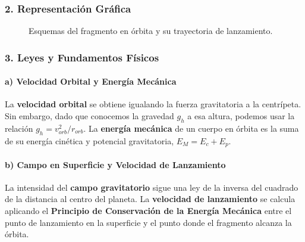 \subsubsection*{2. Representación Gráfica}
\begin{figure}[H]
    \centering
    \hfill
    \caption{Esquemas del fragmento en órbita y su trayectoria de lanzamiento.}
\end{figure}

\subsubsection*{3. Leyes y Fundamentos Físicos}
\paragraph*{a) Velocidad Orbital y Energía Mecánica}
La \textbf{velocidad orbital} se obtiene igualando la fuerza gravitatoria a la centrípeta. Sin embargo, dado que conocemos la gravedad $g_h$ a esa altura, podemos usar la relación $g_h = v_{orb}^2/r_{orb}$. La \textbf{energía mecánica} de un cuerpo en órbita es la suma de su energía cinética y potencial gravitatoria, $E_M = E_c + E_p$.
\paragraph*{b) Campo en Superficie y Velocidad de Lanzamiento}
La intensidad del \textbf{campo gravitatorio} sigue una ley de la inversa del cuadrado de la distancia al centro del planeta. La \textbf{velocidad de lanzamiento} se calcula aplicando el \textbf{Principio de Conservación de la Energía Mecánica} entre el punto de lanzamiento en la superficie y el punto donde el fragmento alcanza la órbita.

